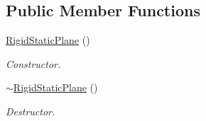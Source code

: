 \subsection*{Public Member Functions}
\begin{DoxyCompactItemize}
\item 
\hypertarget{classContent_1_1Actor_1_1Physics_1_1RigidStaticPlane_aec0fcb6869391c446fb6192b72247b15}{
\hyperlink{classContent_1_1Actor_1_1Physics_1_1RigidStaticPlane_aec0fcb6869391c446fb6192b72247b15}{RigidStaticPlane} ()}
\label{classContent_1_1Actor_1_1Physics_1_1RigidStaticPlane_aec0fcb6869391c446fb6192b72247b15}

\begin{DoxyCompactList}\small\item\em Constructor. \item\end{DoxyCompactList}\item 
\hypertarget{classContent_1_1Actor_1_1Physics_1_1RigidStaticPlane_a74afafb3e25dcbe0d123cc8866d0d306}{
\hyperlink{classContent_1_1Actor_1_1Physics_1_1RigidStaticPlane_a74afafb3e25dcbe0d123cc8866d0d306}{$\sim$RigidStaticPlane} ()}
\label{classContent_1_1Actor_1_1Physics_1_1RigidStaticPlane_a74afafb3e25dcbe0d123cc8866d0d306}

\begin{DoxyCompactList}\small\item\em Destructor. \item\end{DoxyCompactList}\end{DoxyCompactItemize}
